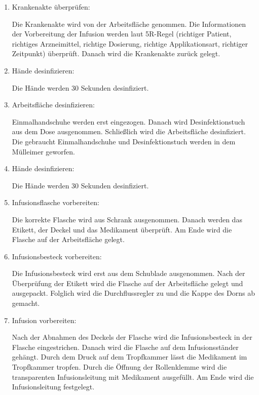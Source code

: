   \begin{enumerate}[start=0]
      \item Krankenakte überprüfen:
      
      Die Krankenakte wird von der Arbeitsfläche genommen. Die Informationen der Vorbereitung der Infusion werden laut 5R-Regel (richtiger Patient, richtiges Arzneimittel, richtige Dosierung, richtige Applikationsart, richtiger Zeitpunkt) überprüft. Danach wird die Krankenakte zurück gelegt.
      
      \item Hände desinfizieren:
      
      Die Hände werden 30 Sekunden desinfiziert.
      
      \item Arbeitsfläche desinfizieren:
      
      Einmalhandschuhe werden erst eingezogen. Danach wird Desinfektionstuch aus dem Dose ausgenommen. Schließlich wird die Arbeitsfläche desinfiziert. Die gebraucht Einmalhandschuhe und Desinfektionstuch werden in dem Mülleimer geworfen.
      
      \item Hände desinfizieren:
      
      Die Hände werden 30 Sekunden desinfiziert.
      
      \item Infusionsflasche vorbereiten:
      
      Die korrekte Flasche wird aus Schrank ausgenommen. Danach werden das Etikett, der Deckel und das Medikament überprüft. Am Ende wird die Flasche auf der Arbeitsfläche gelegt.
      
      \item Infusionsbesteck vorbereiten:
      
      Die Infusionsbesteck wird erst aus dem Schublade ausgenommen. Nach der Überprüfung der Etikett wird die Flasche auf der Arbeitsfläche gelegt und ausgepackt. Folglich wird die Durchflussregler zu und die Kappe des Dorns ab gemacht.
      
      \item Infusion vorbereiten:
      
      Nach der Abnahmen des Deckels der Flasche wird die Infusionsbesteck in der Flasche eingestrichen. Danach wird die Flasche auf dem Infusionsständer gehängt. Durch dem Druck auf dem Tropfkammer lässt die Medikament im Tropfkammer tropfen. Durch die Öffnung der Rollenklemme wird die transparenten Infusionsleitung mit Medikament ausgefüllt. Am Ende wird die Infusionsleitung festgelegt.
      

\end{enumerate}
